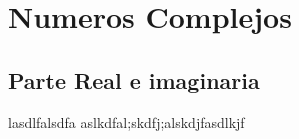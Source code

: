 \section{Numeros Complejos}
\subsection{Parte Real e imaginaria}

lasdlfalsdfa
aslkdfal;skdfj;alskdjfasdlkjf

